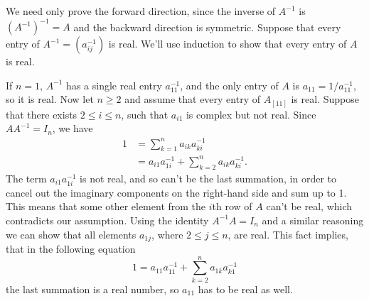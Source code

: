 We need only prove the forward direction, since the inverse of $A^{-1}$ is $(A^{-1})^{-1}=A$ and the backward direction is symmetric.
Suppose that every entry of $A^{-1}=(a_{ij}^{-1})$ is real.
We'll use induction to show that every entry of $A$ is real.

If $n=1$, $A^{-1}$ has a single real entry $a_{11}^{-1}$, and the only entry of $A$ is $a_{11}=1/a_{11}^{-1}$, so it is real.
Now let $n\ge2$ and assume that every entry of $A_{[11]}$ is real.
Suppose that there exists $2\le i\le n$, such that $a_{i1}$ is complex but not real.
Since $AA^{-1}=I_n$, we have
\begin{align*}
    1 &= \sum_{k=1}^na_{ik}a_{ki}^{-1} \\
    &= a_{i1}a_{1i}^{-1}+\sum_{k=2}^na_{ik}a_{ki}^{-1}.
\end{align*}
The term $a_{i1}a_{1i}^{-1}$ is not real, and so can't be the last summation, in order to cancel out the imaginary components on the right-hand side and sum up to 1.
This means that some other element from the $i$th row of $A$ can't be real, which contradicts our assumption.
Using the identity $A^{-1}A=I_n$ and a similar reasoning we can show that all elements $a_{1j}$, where $2\le j\le n$, are real.
This fact implies, that in the following equation
\[
    1 = a_{11}a_{11}^{-1}+\sum_{k=2}^na_{1k}a_{k1}^{-1}
\]
the last summation is a real number, so $a_{11}$ has to be real as well.
